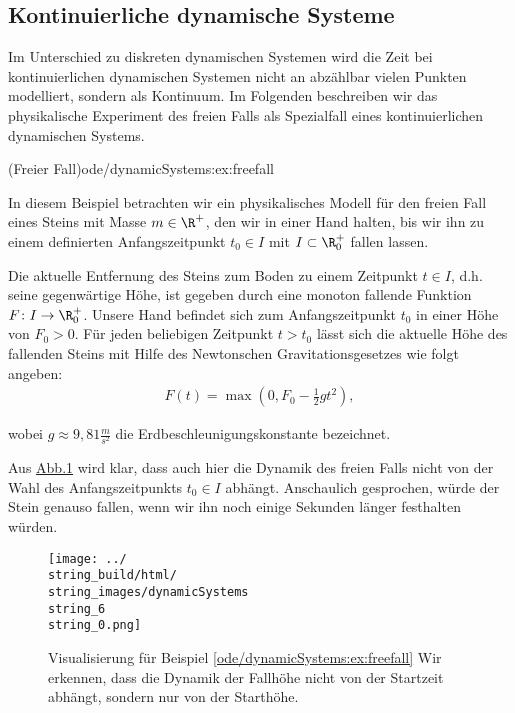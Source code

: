 \documentclass[letterpaper,10pt,german]{jupyterBook}
\begin{document}
\subsection{Kontinuierliche dynamische Systeme}
\label{\detokenize{ode/dynamicSystems:kontinuierliche-dynamische-systeme}}
\par
Im Unterschied zu diskreten dynamischen Systemen wird die Zeit bei kontinuierlichen dynamischen Systemen nicht an abzählbar vielen Punkten modelliert, sondern als Kontinuum.
Im Folgenden beschreiben wir das physikalische Experiment des freien Falls als Spezialfall eines kontinuierlichen dynamischen Systems.
\begin{example}{(Freier Fall)}{ode/dynamicSystems:ex:freefall}



\par
In diesem Beispiel betrachten wir ein physikalisches Modell für den freien Fall eines Steins mit Masse \(m \in \R^+\), den wir in einer Hand halten, bis wir ihn zu einem definierten Anfangszeitpunkt \(t_0 \in I\) mit \(I \subset \R^+_0\) fallen lassen.

\par
Die aktuelle Entfernung des Steins zum Boden zu einem Zeitpunkt \(t \in I\), d.h. seine gegenwärtige Höhe, ist gegeben durch eine monoton fallende Funktion \(F \colon I \rightarrow \R^+_0\).
Unsere Hand befindet sich zum Anfangszeitpunkt \(t_0\) in einer Höhe von \(F_0 > 0\).
Für jeden beliebigen Zeitpunkt \(t > t_0\) lässt sich die aktuelle Höhe des fallenden Steins mit Hilfe des Newtonschen Gravitationsgesetzes wie folgt angeben:
\begin{align*}
F(t) = \max(0, F_0 - \frac{1}{2}gt^2),
\end{align*}
\par
wobei \(g \approx 9,81 \frac{m}{s^2}\) die Erdbeschleunigungskonstante bezeichnet.

\par
Aus \hyperref[\detokenize{ode/dynamicSystems:fig-free-fall}]{Abb.\@ \ref{\detokenize{ode/dynamicSystems:fig-free-fall}}} wird klar, dass auch hier die Dynamik des freien Falls nicht von der Wahl des Anfangszeitpunkts \(t_0 \in I\) abhängt.
Anschaulich gesprochen, würde der Stein genauso fallen, wenn wir ihn noch einige Sekunden länger festhalten würden.
\end{example}

\begin{figure}[htbp]
\centering



\noindent\texttt{[image: ../\\string\_build/html/\\string\_images/dynamicSystems\\string\_6\\string\_0.png]}

\caption{Visualisierung für Beispiel \cref{ode/dynamicSystems:ex:freefall}  Wir erkennen, dass die Dynamik der Fallhöhe nicht von der Startzeit abhängt, sondern nur von der Starthöhe.}\label{\detokenize{ode/dynamicSystems:fig-free-fall}}\end{figure}
\end{document}
